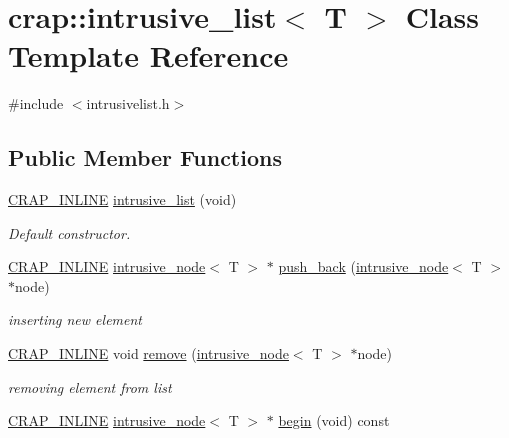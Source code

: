 \hypertarget{singletoncrap_1_1intrusive__list}{\section{crap\+:\+:intrusive\+\_\+list$<$ T $>$ Class Template Reference}
\label{singletoncrap_1_1intrusive__list}
}


{\ttfamily \#include $<$intrusivelist.\+h$>$}

\subsection*{Public Member Functions}
\begin{DoxyCompactItemize}
\item 
\hyperlink{config__x86_8h_a5a40526b8d842e7ff731509998bb0f1c}{C\+R\+A\+P\+\_\+\+I\+N\+L\+I\+N\+E} \hyperlink{singletoncrap_1_1intrusive__list_a3eb29c7fc0e511940c5a6bf6def09bc6}{intrusive\+\_\+list} (void)
\begin{DoxyCompactList}\small\item\em Default constructor. \end{DoxyCompactList}\item 
\hyperlink{config__x86_8h_a5a40526b8d842e7ff731509998bb0f1c}{C\+R\+A\+P\+\_\+\+I\+N\+L\+I\+N\+E} \hyperlink{classcrap_1_1intrusive__node}{intrusive\+\_\+node}$<$ T $>$ $\ast$ \hyperlink{singletoncrap_1_1intrusive__list_a6cb852c53ba71a4e891738aace985e8e}{push\+\_\+back} (\hyperlink{classcrap_1_1intrusive__node}{intrusive\+\_\+node}$<$ T $>$ $\ast$node)
\begin{DoxyCompactList}\small\item\em inserting new element \end{DoxyCompactList}\item 
\hyperlink{config__x86_8h_a5a40526b8d842e7ff731509998bb0f1c}{C\+R\+A\+P\+\_\+\+I\+N\+L\+I\+N\+E} void \hyperlink{singletoncrap_1_1intrusive__list_aa82242df86538f8a2f41a4f21b7f5227}{remove} (\hyperlink{classcrap_1_1intrusive__node}{intrusive\+\_\+node}$<$ T $>$ $\ast$node)
\begin{DoxyCompactList}\small\item\em removing element from list \end{DoxyCompactList}\item 
\hyperlink{config__x86_8h_a5a40526b8d842e7ff731509998bb0f1c}{C\+R\+A\+P\+\_\+\+I\+N\+L\+I\+N\+E} \hyperlink{classcrap_1_1intrusive__node}{intrusive\+\_\+node}$<$ T $>$ $\ast$ \hyperlink{singletoncrap_1_1intrusive__list_a1e3a33e52f9376255e2a74ec3fbe1f61}{begin} (void) const 

\end{DoxyCompactItemize}
